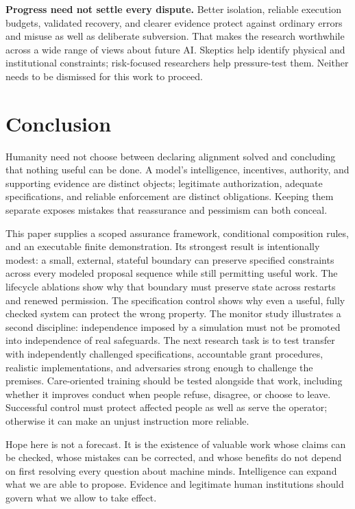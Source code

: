 \documentclass[10pt,twocolumn,letterpaper]{article}
\newcommand{\para}[1]{\smallskip\noindent\textbf{#1}\enspace}
\begin{document}
\para{Progress need not settle every dispute.} Better isolation, reliable execution budgets, validated recovery, and clearer evidence protect against ordinary errors and misuse as well as deliberate subversion. That makes the research worthwhile across a wide range of views about future AI. Skeptics help identify physical and institutional constraints; risk-focused researchers help pressure-test them. Neither needs to be dismissed for this work to proceed.

\section{Conclusion}
Humanity need not choose between declaring alignment solved and concluding that nothing useful can be done. A model's intelligence, incentives, authority, and supporting evidence are distinct objects; legitimate authorization, adequate specifications, and reliable enforcement are distinct obligations. Keeping them separate exposes mistakes that reassurance and pessimism can both conceal.

This paper supplies a scoped assurance framework, conditional composition rules, and an executable finite demonstration. Its strongest result is intentionally modest: a small, external, stateful boundary can preserve specified constraints across every modeled proposal sequence while still permitting useful work. The lifecycle ablations show why that boundary must preserve state across restarts and renewed permission. The specification control shows why even a useful, fully checked system can protect the wrong property. The monitor study illustrates a second discipline: independence imposed by a simulation must not be promoted into independence of real safeguards. The next research task is to test transfer with independently challenged specifications, accountable grant procedures, realistic implementations, and adversaries strong enough to challenge the premises. Care-oriented training should be tested alongside that work, including whether it improves conduct when people refuse, disagree, or choose to leave. Successful control must protect affected people as well as serve the operator; otherwise it can make an unjust instruction more reliable.

Hope here is not a forecast. It is the existence of valuable work whose claims can be checked, whose mistakes can be corrected, and whose benefits do not depend on first resolving every question about machine minds. Intelligence can expand what we are able to propose. Evidence and legitimate human institutions should govern what we allow to take effect.
\end{document}
